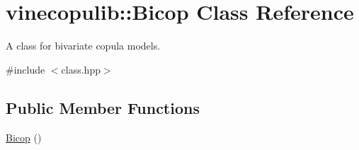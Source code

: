 \hypertarget{classvinecopulib_1_1_bicop}{\section{vinecopulib\+:\+:Bicop Class Reference}
\label{classvinecopulib_1_1_bicop}
}


A class for bivariate copula models.  




{\ttfamily \#include $<$class.\+hpp$>$}

\subsection*{Public Member Functions}
\begin{DoxyCompactItemize}
\item 
\hypertarget{classvinecopulib_1_1_bicop_acfa522fb0bea4aca8fade87c18bcf921}{\hyperlink{classvinecopulib_1_1_bicop_acfa522fb0bea4aca8fade87c18bcf921}{Bicop} ()}\label{classvinecopulib_1_1_bicop_acfa522fb0bea4aca8fade87c18bcf921}


\end{DoxyCompactItemize}
